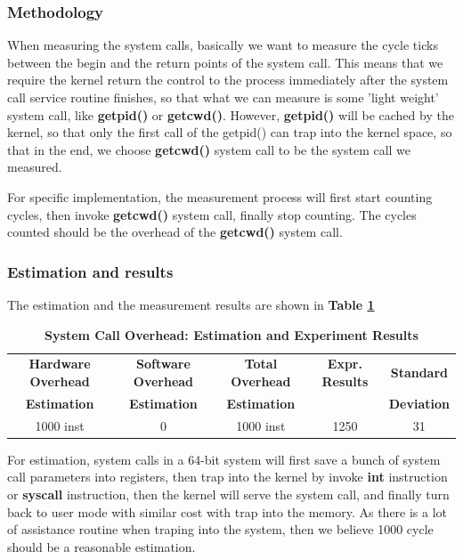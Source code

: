 \subsubsection{Methodology}

When measuring the system calls, basically we want to measure the cycle ticks between the begin and the return points of the system call. This means that we require the kernel return the control to the process immediately after the system call service routine finishes, so that what we can measure is some 'light weight' system call, like \textbf{getpid()} or \textbf{getcwd()}. However, \textbf{getpid()} will be cached by the kernel, so that only the first call of the getpid() can trap into
the kernel space, so that in the end, we choose \textbf{getcwd()} system call to be the system call we measured.

For specific implementation, the measurement process will first start counting cycles, then invoke \textbf{getcwd()} system call, finally stop counting. The cycles counted should be the overhead of the \textbf{getcwd()} system call.


\subsubsection{Estimation and results}

The estimation and the measurement results are shown in \textbf{Table \ref{measurement_syscall_table}}

\begin{table}[ht]
  \centering
  \caption{\textbf{System Call Overhead: Estimation and Experiment Results}}
  \begin{threeparttable}
  \begin{tabular}{ccccc}
  \hline
      \textbf{Hardware Overhead} & \textbf{Software Overhead } & \textbf{Total Overhead} & \textbf{Expr. Results} & \textbf{Standard}\\
      \textbf{Estimation}       &  \textbf{Estimation}         & \textbf{Estimation}  &     & \textbf{Deviation}\\
  \hline
  1000 inst & 0 & 1000 inst & 1250 & 31 \\
  \hline
  \end{tabular}
  \end{threeparttable}
  \label{measurement_syscall_table}
\end{table}

For estimation, system calls in a 64-bit system will first save a bunch of system call parameters into registers, then trap into the kernel by invoke \textbf{int} instruction or \textbf{syscall} instruction, then the kernel will serve the system call, and finally turn back to user mode with similar cost with trap into the memory. As there is a lot of assistance routine when traping into the system, then we believe 1000 cycle should be a reasonable estimation.

